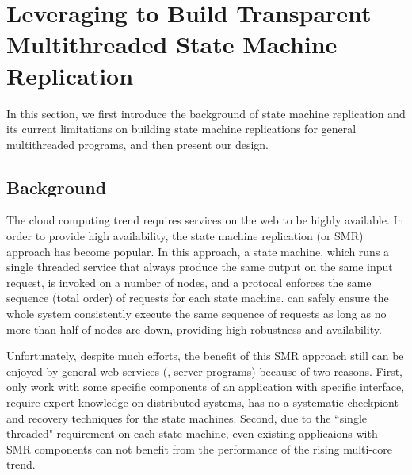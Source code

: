 \section{Leveraging \smt to Build Transparent Multithreaded State Machine Replication} \label{sec:replication}

In this section, we first introduce the background of state machine replication 
and its current limitations on building state machine replications for general 
multithreaded programs, and then present our design.

\subsection{Background} \label{sec:rep-intro}

  
The cloud computing trend requires services on the web to be highly available. In order to 
provide high availability, the state machine replication (or SMR) approach has 
become popular. In this approach, a state machine, which runs a single threaded 
service that always produce the same output on the same input request, 
is invoked on a number of nodes, and a \paxos protocal enforces the same 
sequence (total order) of requests for each state machine. \paxos can safely ensure
the whole system consistently execute the same sequence of requests as long as 
no more than half of nodes are down, providing high robustness and availability.


Unfortunately, despite much efforts, the benefit of this SMR approach still can 
be enjoyed by general web services (\eg, server programs) because of two 
reasons. First, only work with some specific components of an application with 
specific interface, require expert knowledge on 
distributed systems, has no a systematic checkpiont and recovery techniques for 
the state machines. Second, due to the ``single threaded" requirement on each 
state machine, even existing applicaions with SMR components can not 
benefit from the performance of the rising multi-core trend.


